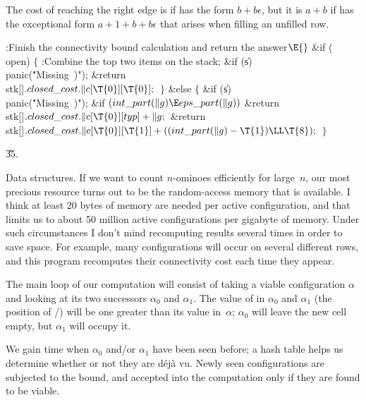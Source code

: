 The cost of reaching the right edge is  if  has the form
$b+b\epsilon$, but it is $a+b$ if  has the exceptional form
$a+1+b+b\epsilon$ that arises when filling an unfilled row.

\Y\B\4:Finish the connectivity bound calculation and return the answer\X${}%
\E{}$\6
\&{if} (\\{open})\5
${}\{{}$\1\6
:Combine the top two items on the stack\X;\6
\&{if} (\|s)\1\5
\\{panic}(\.{"Missing\ )"});\2\6
\&{return} \\{stk}[]${}.\\{closed\_cost}.\|c[\T{0}][\T{0}];{}$\6
\4${}\}{}$\5
\2\&{else}\5
${}\{{}$\1\6
\&{if} (\|s)\1\5
\\{panic}(\.{"Missing\ )"});\2\6
\&{if} ${}(\\{int\_part}(\|g)\E\\{eps\_part}(\|g)){}$\1\5
\&{return} \\{stk}[]${}.\\{closed\_cost}.\|c[\T{0}][\\{typ}]+\|g;{}$\2\6
\&{return} \\{stk}[]${}.\\{closed\_cost}.\|c[\T{0}][\T{1}]+((\\{int%
\_part}(\|g)-\T{1})\LL\T{8});{}$\6
\4${}\}{}$\2\par
\U35.\fi

Data structures. If we want to count $n$-ominoes efficiently for
large~$n$,
our most precious resource turns out to be the random-access memory that
is available. I think at least 20 bytes of memory are needed per active
configuration, and that limits us to about 50 million active configurations per
gigabyte of memory. Under such circumstances I don't mind recomputing results
several times in order to save space. For example, many configurations will
occur on several different rows, and this program recomputes their
connectivity cost each time they appear.

The main loop of our computation will consist of taking a viable configuration
$\alpha$ and looking at its two successors $\alpha_0$ and $\alpha_1$. The
value of  in $\alpha_0$ and $\alpha_1$ (the position of
\qcaret/) will be one greater than its value in~$\alpha$;
$\alpha_0$ will leave the new cell empty, but $\alpha_1$ will occupy it.

We gain time when $\alpha_0$ and/or $\alpha_1$ have been seen before;
a hash table helps us determine whether or not they are d\'ej\`a vu.
Newly seen configurations are subjected to the  bound, and
accepted into the computation only if they are found to be viable.

